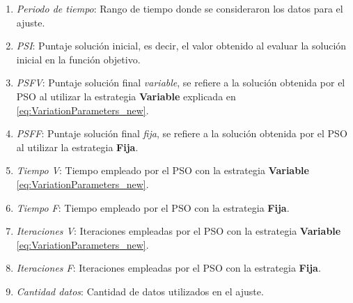 \begin{enumerate}
    \item \emph{Periodo de tiempo}: Rango de tiempo donde se consideraron los datos para el ajuste.
    \item \emph{PSI}: Puntaje solución inicial, es decir, el valor obtenido al evaluar la solución inicial en la función objetivo.
    \item \emph{PSFV}: Puntaje solución final \emph{variable}, se refiere a la solución obtenida por el PSO al utilizar la estrategia \textbf{Variable} explicada en \ref{eq:VariationParameters_new}.
    \item \emph{PSFF}: Puntaje solución final \emph{fija}, se refiere a la solución obtenida por el PSO al utilizar la estrategia \textbf{Fija}.
    \item \emph{Tiempo V}: Tiempo empleado por el PSO con la estrategia \textbf{Variable} \ref{eq:VariationParameters_new}. 
    \item \emph{Tiempo F}: Tiempo empleado por el PSO con la estrategia \textbf{Fija}. 
    \item \emph{Iteraciones V}: Iteraciones empleadas por el PSO con la estrategia \textbf{Variable} \ref{eq:VariationParameters_new}. 
    \item \emph{Iteraciones F}: Iteraciones empleadas por el PSO con la estrategia \textbf{Fija}. 
    \item \emph{Cantidad datos}: Cantidad de datos utilizados en el ajuste.
\end{enumerate}

